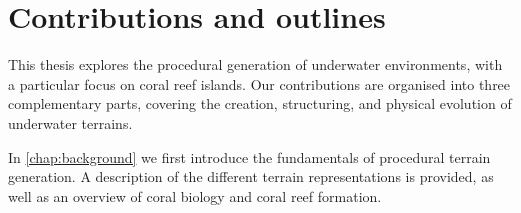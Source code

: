 







\section{Contributions and outlines}
This thesis explores the procedural generation of underwater environments, with a particular focus on coral reef islands. Our contributions are organised into three complementary parts, covering the creation, structuring, and physical evolution of underwater terrains.

In \cref{chap:background} we first introduce the fundamentals of procedural terrain generation. A description of the different terrain representations is provided, as well as an overview of coral biology and coral reef formation.

